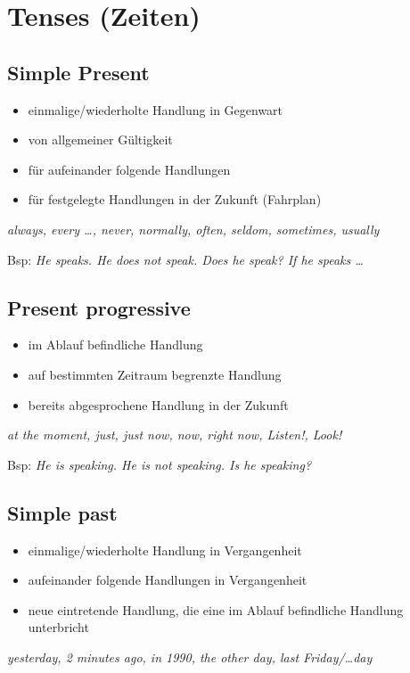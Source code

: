 \section{Tenses (Zeiten)}
\subsection{Simple Present}
\begin{itemize}\itemsep0em
	\item einmalige/wiederholte Handlung in Gegenwart
	\item von allgemeiner Gültigkeit
	\item für aufeinander folgende Handlungen
	\item für festgelegte Handlungen in der Zukunft (Fahrplan)
\end{itemize}
\textit{always, every \dots, never, normally, often, seldom, sometimes, usually}

Bsp: \textit{He speaks. He does not speak. Does he speak? If he speaks \dots}

\subsection{Present progressive}
\begin{itemize}\itemsep0em
	\item im Ablauf befindliche Handlung
	\item auf bestimmten Zeitraum begrenzte Handlung
	\item bereits abgesprochene Handlung in der Zukunft
\end{itemize}
\textit{at the moment, just, just now, now, right now, Listen!, Look!}

Bsp: \textit{He is speaking. He is not speaking. Is he speaking?}

\subsection{Simple past}
\begin{itemize}\itemsep0em
	\item einmalige/wiederholte Handlung in Vergangenheit
	\item aufeinander folgende Handlungen in Vergangenheit
	\item neue eintretende Handlung, die eine im Ablauf befindliche Handlung unterbricht
\end{itemize}
\textit{yesterday, 2 minutes ago, in 1990, the other day, last Friday/\dots day}

